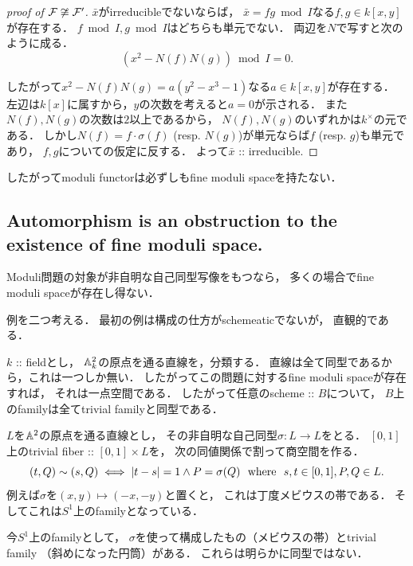 \documentclass[a4paper]{jsarticle}
\begin{document}
\begin{proof}[proof of $\mathcal{F} \not \cong \mathcal{F}'$]
        $\bar{x}$がirreducibleでないならば，
        $\bar{x}=fg \bmod I$なる$f,g \in k[x,y]$が存在する．
        $f \bmod I, g \bmod I$はどちらも単元でない．
        両辺を$N$で写すと次のように成る．
        \[ (x^2-N(f)N(g)) \bmod I=0. \]

        したがって$x^2-N(f)N(g)=a(y^2-x^3-1)$なる$a \in k[x,y]$が存在する．
        左辺は$k[x]$に属すから，$y$の次数を考えると$a=0$が示される．
        また$N(f), N(g)$の次数は$2$以上であるから，
        $N(f), N(g)$のいずれかは$k^{\times}$の元である．
        しかし$N(f)=f \cdot \sigma(f)$ (resp. $N(g)$)が単元ならば$f$ (resp. $g$)も単元であり，
        $f,g$についての仮定に反する．
        よって$\bar{x}$ :: irreducible.
    \end{proof}

    したがってmoduli functorは必ずしもfine moduli spaceを持たない．

    \subsection{Automorphism is an obstruction to the existence of fine moduli space.}
    Moduli問題の対象が非自明な自己同型写像をもつなら，
    多くの場合でfine moduli spaceが存在し得ない．

    例を二つ考える．
    最初の例は構成の仕方がschemeaticでないが，
    直観的である．
    \begin{Example}
        $k$ :: fieldとし，
        $\mathbb{A}^2_k$の原点を通る直線を，分類する．
        直線は全て同型であるから，これは一つしか無い．
        したがってこの問題に対するfine moduli spaceが存在すれば，
        それは一点空間である．
        したがって任意のscheme :: $B$について，
        $B$上のfamilyは全てtrivial familyと同型である．
        
        $L$を$\mathbb{A}^2$の原点を通る直線とし，
        その非自明な自己同型$\sigma: L \to L$をとる．
        $[0,1]$上のtrivial fiber :: $[0,1] \times L$を，
        次の同値関係で割って商空間を作る．
        \[ (t, Q) \sim (s, Q) \iff |t-s|=1 \land P=\sigma(Q) ~~\text{where}~~ s,t \in [0,1], P,Q \in L. \]
        例えば$\sigma$を$(x,y) \mapsto (-x,-y)$と置くと，
        これは丁度メビウスの帯である．
        そしてこれは$S^1$上のfamilyとなっている．

        今$S^1$上のfamilyとして，
        $\sigma$を使って構成したもの（メビウスの帯）とtrivial family （斜めになった円筒）がある．
        これらは明らかに同型ではない．
    \end{Example}
\end{document}
